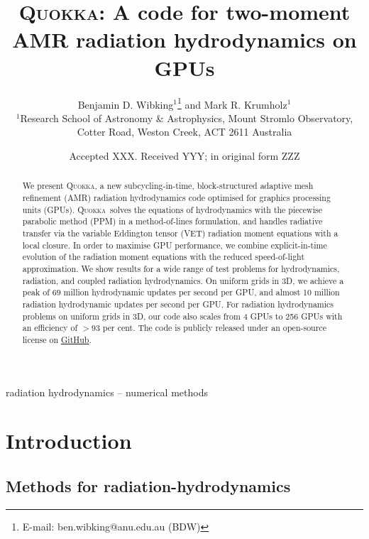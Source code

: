 \documentclass[fleqn,usenatbib]{mnras}
\title[Two-moment AMR radiation hydrodynamics on GPUs]{\textsc{Quokka}: A code for two-moment AMR radiation hydrodynamics on GPUs}
\author[B. D. Wibking et al.]{
    Benjamin D. Wibking$^{1}$\thanks{E-mail: ben.wibking@anu.edu.au (BDW)}
    and Mark R. Krumholz$^{1}$
\\
$^{1}$Research School of Astronomy \& Astrophysics, Mount Stromlo Observatory, Cotter Road, Weston Creek, ACT 2611 Australia\\
}
\date{Accepted XXX. Received YYY; in original form ZZZ}
\newcommand{\quokka}{\textsc{Quokka}}
\begin{document}
\label{firstpage}
\pagerange{\pageref{firstpage}--\pageref{lastpage}}
\maketitle

\begin{abstract}
    We present \quokka, a new subcycling-in-time, block-structured adaptive mesh refinement (AMR) radiation hydrodynamics code optimised for graphics processing units (GPUs). \quokka~solves the equations of hydrodynamics with the piecewise parabolic method (PPM) in a method-of-lines formulation, and handles radiative transfer via the variable Eddington tensor (VET) radiation moment equations with a local closure. In order to maximise GPU performance, we combine explicit-in-time evolution of the radiation moment equations with the reduced speed-of-light approximation. We show results for a wide range of test problems for hydrodynamics, radiation, and coupled radiation hydrodynamics. On uniform grids in 3D, we achieve a peak of $69$ million hydrodynamic updates per second per GPU, and almost 10 million radiation hydrodynamic updates per second per GPU. For radiation hydrodynamics problems on uniform grids in 3D, our code also scales from 4 GPUs to 256 GPUs with an efficiency of $>93$ per cent. The code is publicly released under an open-source license on \faGithub\href{https://github.com/BenWibking/quokka-code}{GitHub}.
\end{abstract}

\begin{keywords}
radiation hydrodynamics -- numerical methods
\end{keywords}



\section{Introduction}


\subsection{Methods for radiation-hydrodynamics}
\end{document}
